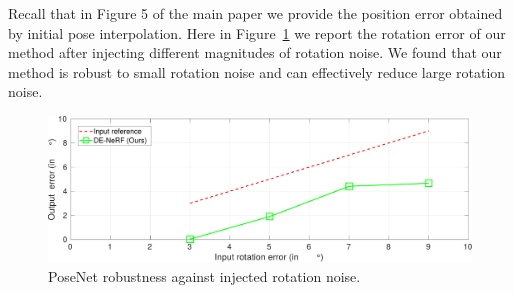 \documentclass[10pt,twocolumn,letterpaper]{article}
\begin{document}
\begin{table}[!htbp]
\begin{center}
\vspace{1mm}
\caption{\textbf{Absolute pose vs. residual pose.} In the upper row the PoseNet is trained to learn the residual from the interpolated poses using RGB frame poses, while the bottom row is trained to learn the pose directly. 
}
\label{tab:different_pose}
\end{center}
\end{table}

Recall that in Figure 5 of the main paper we provide the position error obtained by initial pose interpolation. Here in Figure~\ref{fig:roation_error} we report the rotation error of our method after injecting different magnitudes of rotation noise. We found that our method is robust to small rotation noise and can effectively reduce large rotation noise.



\begin{figure}
    \centering
    \includegraphics[width=0.960\linewidth]{rotation_error.pdf}    
    \caption{{PoseNet robustness against injected rotation noise.} }
    \label{fig:roation_error}
\end{figure}

\end{document}
